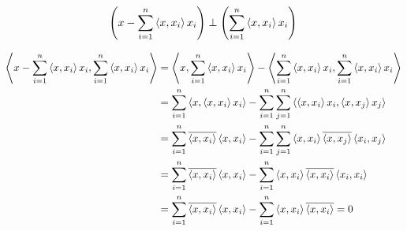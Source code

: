\begin{lema}
    \begin{equation}
        \left( x - \sum_{i=1}^n \left\langle x,x_i \right\rangle x_i\right)
        \perp \left( \sum_{i=1}^n \left\langle x,x_i \right\rangle x_i \right)
    \end{equation}
    \label{lema:bessel_prereq}
\end{lema}
\begin{dokaz}
    \begin{equation*}
    \begin{split}
        \left\langle  x - \sum_{i=1}^n \left\langle x,x_i \right\rangle x_i, 
                \sum_{i=1}^n \left\langle x,x_i \right\rangle x_i \right\rangle &= 
        \left\langle x,\sum_{i=1}^n \left\langle x,x_i \right\rangle x_i \right\rangle -
        \left\langle \sum_{i=1}^n \left\langle x,x_i \right\rangle x_i, 
                \sum_{i=1}^n \left\langle x,x_i \right\rangle x_i \right\rangle \\ &=
        \sum_{i=1}^n\left\langle x,\left\langle x,x_i \right\rangle x_i \right\rangle -
        \sum_{i=1}^n \sum_{j=1}^n
         \left\langle \left\langle x,x_i \right\rangle x_i,\left\langle x,x_j \right\rangle x_j \right\rangle \\ &=
         \sum_{i=1}^n\overline{\left\langle x,x_i \right\rangle}\left\langle x,x_i \right\rangle -
        \sum_{i=1}^n \sum_{j=1}^n
         \left\langle x,x_i \right\rangle\overline{\left\langle x,x_j \right\rangle}\left\langle x_i,x_j \right\rangle \\
         &=
        \sum_{i=1}^n\overline{\left\langle x,x_i \right\rangle}\left\langle x,x_i \right\rangle -
        \sum_{i=1}^n
         \left\langle x,x_i \right\rangle\overline{\left\langle x,x_i \right\rangle}\left\langle x_i,x_i \right\rangle \\
         &=
        \sum_{i=1}^n\overline{\left\langle x,x_i \right\rangle}\left\langle x,x_i \right\rangle -
        \sum_{i=1}^n
         \left\langle x,x_i \right\rangle\overline{\left\langle x,x_i \right\rangle} = 0
    \end{split}
    \end{equation*}
\end{dokaz}

